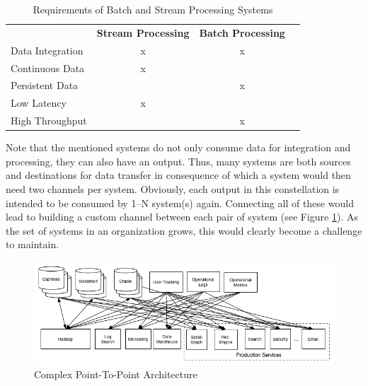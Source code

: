 \begin{table}[H]
\centering
\begin{tabular}{l|c|cl}
\multicolumn{1}{c|}{\textbf{}} & \textbf{Stream Processing} & \textbf{Batch
Processing} & \multicolumn{1}{c}{\textbf{}} \\ \cline{1-3}
Data Integration               & x                          & x
&                               \\
Continuous Data                & x                          &
&                               \\
Persistent Data                &                            & x
&                               \\
Low Latency                    & x                          &
&                               \\
High Throughput                     &                            & x
&
\end{tabular}
\caption{Requirements of Batch and Stream Processing Systems}
\label{table:requirements-batch-stream}
\end{table}
Note that the mentioned systems  do not only consume data for
integration and processing, they can also have an output. Thus, many systems are
both sources and destinations for data transfer in consequence of which a system
would then need two channels  per system. Obviously, each output in
this constellation is intended to be consumed by 1--N system(s) again.
Connecting all of these would lead to building a custom channel between each
pair of system (see Figure \ref{fig:datapipeline_complex}). As the set of systems
in an organization grows, this would clearly become a challenge to maintain.

\begin{figure}[H]
    \centering
    \includegraphics[width=1.0\textwidth]{images/datapipeline_complex.png}
    \caption{Complex Point-To-Point Architecture}
    \label{fig:datapipeline_complex}
\end{figure}

